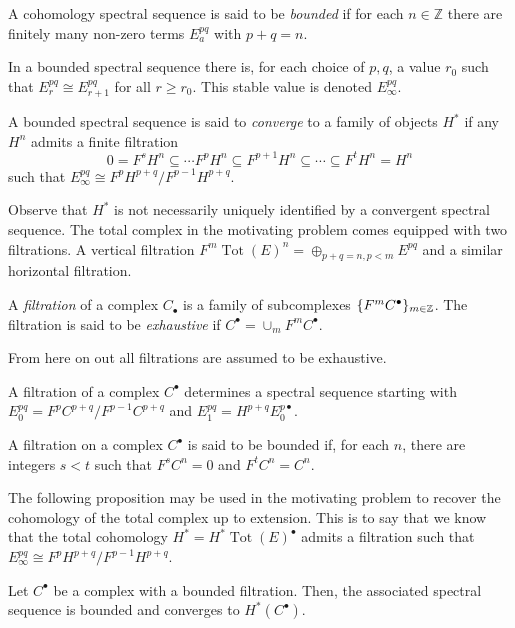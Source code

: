 \begin{definition}
  A cohomology spectral sequence is said to be {\it bounded} if for each $n\in \mathbb{Z}$ there are finitely many non-zero terms $E^{pq}_a$ with $p+q = n$.
\end{definition}
In a bounded spectral sequence there is, for each choice of $p,q$, a value $r_0$ such that $E_{r}^{pq}\cong E_{r+1}^{pq}$ for all $r \geq r_0$. This stable value is denoted $E^{pq}_\infty$.
\begin{definition}
  A bounded spectral sequence is said to {\it converge} to a family of objects $H^*$ if any $H^n$ admits a finite filtration
  $$0 = F^s H^n \subseteq \cdots F^p H^n \subseteq F^{p+1}H^n \subseteq \cdots \subseteq F^t H^n = H^n $$
  such that $E^{pq}_\infty \cong F^p H^{p+q} / F^{p-1} H^{p+q}$.
\end{definition}
Observe that $H^*$ is not necessarily uniquely identified by a convergent spectral sequence.
The total complex in the motivating problem comes equipped with two filtrations.
A vertical filtration $F^{m} \operatorname{Tot}(E)^n = \oplus_{p+q = n, p <m} E^{pq}$ and a similar horizontal filtration.
\begin{definition}
  A {\it filtration} of a complex $C_\bullet$ is a family of subcomplexes $\{F^m C^\bullet\}_{m\in \mathbb{Z}}$.
  The filtration is said to be {\it exhaustive} if $C^\bullet = \cup_m F^mC^\bullet$.
\end{definition}
From here on out all filtrations are assumed to be exhaustive.
\begin{proposition}{\cite[Theorem 5.4.1.]{weibel1995introduction}}
 A filtration of a complex $C^\bullet$ determines a spectral sequence starting with $E^{pq}_0 = F^p C^{p+q}/F^{p-1}C^{p+q}$ and $E^{pq}_1= H^{p+q} E^{p\bullet}_0$.
\end{proposition}
\begin{definition}
 A filtration on a complex $C^\bullet$ is said to be bounded
 if, for each $n$, there are integers $s<t$ such that $F^s C^n = 0$ and $F^t C^n = C^n$.
\end{definition}
The following proposition may be used in the motivating problem to recover the cohomology of the total complex up to extension.
This is to say that we know that the total cohomology $H^* = H^* \operatorname{Tot}(E)^\bullet$ admits a filtration such that $E^{pq}_\infty \cong F^p H^{p+q}/ F^{p-1} H^{p+q}$.
 \begin{proposition}{\cite[Theorem 5.51.]{weibel1995introduction}}\label{prop: FiltrationSpectral}
   Let $C^\bullet$ be a complex with a bounded filtration.
   Then, the associated spectral sequence is bounded and converges to $H^*(C^\bullet)$.
 \end{proposition}
